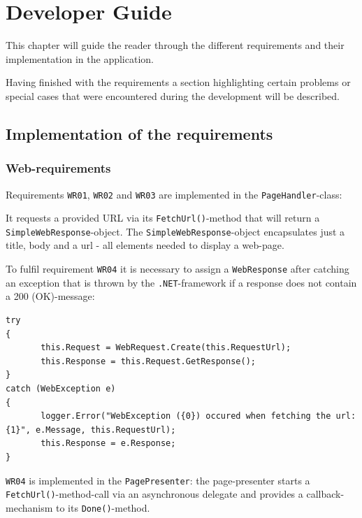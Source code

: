 \chapter{Developer Guide}\label{ch:developer_guide} %

This chapter will guide the reader through the different requirements and their implementation in the application.

Having finished with the requirements a section highlighting certain problems or special cases that were encountered during the development will be described.

\section{Implementation of the requirements}
\label{sec:implementation_requirements}

\subsection{Web-requirements}

Requirements \texttt{WR01}, \texttt{WR02} and \texttt{WR03} are implemented in the \texttt{PageHandler}-class:

It requests a provided \ac{URL} via its \texttt{FetchUrl()}-method that will return a \texttt{SimpleWebResponse}-object. The \texttt{SimpleWebResponse}-object encapsulates just a title, body and a url - all elements needed to display a web-page.

To fulfil requirement \texttt{WR04} it is necessary to assign a \texttt{WebResponse} after catching an exception that is thrown by the \texttt{.NET}-framework if a response does not contain a 200 (OK)-message:

\begin{lstlisting}[caption=Fetching \ac{URL}s with error-codes]
try
{
       this.Request = WebRequest.Create(this.RequestUrl);
       this.Response = this.Request.GetResponse();
}
catch (WebException e)
{
       logger.Error("WebException ({0}) occured when fetching the url: {1}", e.Message, this.RequestUrl);
       this.Response = e.Response;
}
\end{lstlisting}

\texttt{WR04} is implemented in the \texttt{PagePresenter}: the page-presenter starts a \texttt{FetchUrl()}-method-call via an asynchronous delegate and provides a callback-mechanism to its \texttt{Done()}-method.

